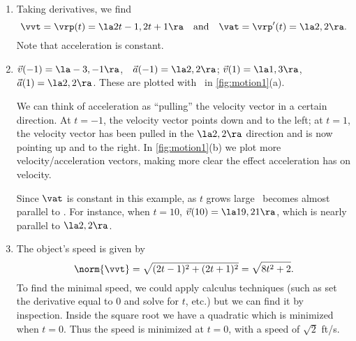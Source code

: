 {\begin{enumerate}
	\item Taking derivatives, we find
	$$\vvt = \vrp(t) =\la 2t-1,2t+1\ra \quad \text{and} \quad \vat = \vrp'(t) = \la 2,2\ra.$$
	Note that acceleration is constant.
	
	\item		$\vec v(-1) = \la -3,-1\ra$,\ \ $\vec a(-1) = \la 2,2\ra$; \quad $\vec v(1) = \la 1,3\ra$,\ \ $\vec a(1) = \la 2,2\ra$. These are plotted with \vrt\ in \autoref{fig:motion1}(a).
	
	We can think of acceleration as ``pulling'' the velocity vector in a certain direction. At $t=-1$, the velocity vector points down and to the left; at $t=1$, the velocity vector has been pulled in the $\la 2,2\ra$ direction and is now pointing up and to the right. In \autoref{fig:motion1}(b) we plot more velocity/acceleration vectors, making more clear the effect acceleration has on velocity.
	
	Since $\vat$ is constant in this example, as $t$ grows large \vvt\ becomes almost parallel to \vat. For instance, when $t=10$, $\vec v(10) = \la 19,21\ra$, which is nearly parallel to $\la 2,2\ra$.
	
	\item		The object's speed is given by 
	$$\norm{\vvt} = \sqrt{(2t-1)^2+(2t+1)^2} =\sqrt{8t^2+2}.$$ To find the minimal speed, we could apply calculus techniques (such as set the derivative equal to 0 and solve for $t$, etc.) but we can find it by inspection. Inside the square root we have a quadratic which is minimized when $t=0$. Thus the speed is minimized at $t=0$, with a speed of $\sqrt{2}$ ft/s.
	

\end{enumerate}}
